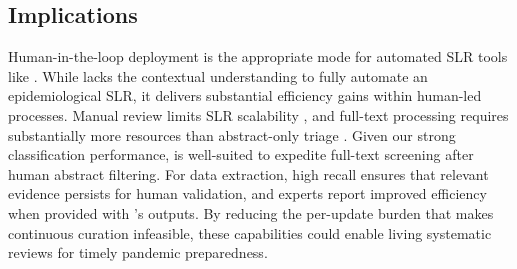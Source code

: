 \subsection{Implications}






Human-in-the-loop deployment is the appropriate mode for automated SLR tools like \name{}. While \name{} lacks the contextual understanding to fully automate an epidemiological SLR, it delivers substantial efficiency gains within human-led processes. Manual review limits SLR scalability \citep{polanin2019best}, and full-text processing requires substantially more resources than abstract-only triage \citep{clark2020full}. Given our strong classification performance, \name{} is well-suited to expedite full-text screening after human abstract filtering. For data extraction, high recall ensures that relevant evidence persists for human validation, and experts report improved efficiency when provided with \name{}'s outputs. By reducing the per-update burden that makes continuous curation infeasible, these capabilities could enable living systematic reviews for timely pandemic preparedness.

